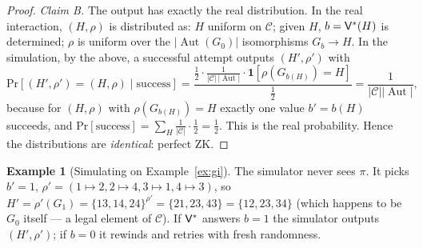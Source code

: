 \documentclass[11pt,a4paper]{report}
\theoremstyle{plain}
\theoremstyle{definition}
\newtheorem{example}[theorem]{Example}
\theoremstyle{remark}
\renewcommand{\Pr}{\mathrm{Pr}}
\newcommand{\Sim}{\mathsf{Sim}}\newcommand{\Ext}{\mathsf{Ext}}
\DeclareMathOperator{\Aut}{Aut}
\begin{document}
\begin{proof}
\emph{Claim B.} The output has exactly the real distribution. In the real interaction, $(H,\rho)$ is distributed as: $H$ uniform on $\mathcal C$; given $H$, $b=\mathsf{V}^*(H)$ is determined; $\rho$ is uniform over the $|\Aut(G_0)|$ isomorphisms $G_b\to H$. In the simulation, by the above, a successful attempt outputs $(H',\rho')$ with
\[
\Pr[(H',\rho')=(H,\rho)\mid \text{success}]
=\frac{\tfrac12\cdot\tfrac{1}{|\mathcal C|\,|\Aut|}\cdot\mathbf 1[\rho(G_{b(H)})=H]}{\tfrac12}=\frac{1}{|\mathcal C||\Aut|},
\]
because for $(H,\rho)$ with $\rho(G_{b(H)})=H$ exactly one value $b'=b(H)$ succeeds, and $\Pr[\text{success}]=\sum_H\frac{1}{|\mathcal C|}\cdot\frac12=\frac12$. This is the real probability. Hence the distributions are \emph{identical}: perfect ZK.
\end{proof}
\begin{example}[Simulating on Example~\ref{ex:gi}]
The simulator never sees $\pi$. It picks $b'=1$, $\rho'=(1\mapsto2,2\mapsto4,3\mapsto1,4\mapsto3)$, so $H'=\rho'(G_1)=\{13,14,24\}^{\rho'}=\{21,23,43\}=\{12,23,34\}$ (which happens to be $G_0$ itself --- a legal element of $\mathcal C$). If $\mathsf{V}^*$ answers $b=1$ the simulator outputs $(H',\rho')$; if $b=0$ it rewinds and retries with fresh randomness.
\end{example}
\begin{center}
\end{center}
\end{document}
